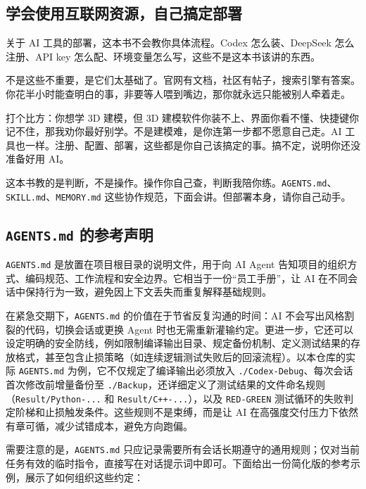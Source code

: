 \subsection{学会使用互联网资源，自己搞定部署}

关于 AI 工具的部署，这本书不会教你具体流程。Codex 怎么装、DeepSeek 怎么注册、API key 怎么配、环境变量怎么写，这些不是这本书该讲的东西。

不是这些不重要，是它们太基础了。官网有文档，社区有帖子，搜索引擎有答案。你花半小时能查明白的事，非要等人喂到嘴边，那你就永远只能被别人牵着走。

打个比方：你想学 3D 建模，但 3D 建模软件你装不上、界面你看不懂、快捷键你记不住，那我劝你最好别学。不是建模难，是你连第一步都不愿意自己走。AI 工具也一样。注册、配置、部署，这些都是你自己该搞定的事。搞不定，说明你还没准备好用 AI。

这本书教的是判断，不是操作。操作你自己查，判断我陪你练。\texttt{AGENTS.md}、\texttt{SKILL.md}、\texttt{MEMORY.md} 这些协作规范，下面会讲。但部署本身，请你自己动手。

\subsection{\texttt{AGENTS.md} 的参考声明}

\texttt{AGENTS.md} 是放置在项目根目录的说明文件，用于向 AI Agent 告知项目的组织方式、编码规范、工作流程和安全边界。它相当于一份“员工手册”，让 AI 在不同会话中保持行为一致，避免因上下文丢失而重复解释基础规则。

在紧急交期下，\texttt{AGENTS.md} 的价值在于节省反复沟通的时间：AI 不会写出风格割裂的代码，切换会话或更换 Agent 时也无需重新灌输约定。更进一步，它还可以设定明确的安全防线，例如限制编译输出目录、规定备份机制、定义测试结果的存放格式，甚至包含止损策略（如连续逻辑测试失败后的回滚流程）。以本仓库的实际 \texttt{AGENTS.md} 为例，它不仅规定了编译输出必须放入 \texttt{./Codex-Debug}、每次会话首次修改前增量备份至 \texttt{./Backup}，还详细定义了测试结果的文件命名规则（\texttt{Result/Python-...} 和 \texttt{Result/C++-...}），以及 \texttt{RED-GREEN} 测试循环的失败判定阶梯和止损触发条件。这些规则不是束缚，而是让 AI 在高强度交付压力下依然有章可循，减少试错成本，避免方向跑偏。

需要注意的是，\texttt{AGENTS.md} 只应记录需要所有会话长期遵守的通用规则；仅对当前任务有效的临时指令，直接写在对话提示词中即可。下面给出一份简化版的参考示例，展示了如何组织这些约定：


